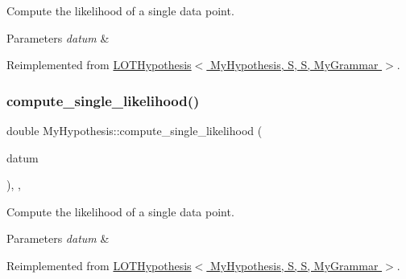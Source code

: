 Compute the likelihood of a single data point. 


\begin{DoxyParams}{Parameters}
{\em datum} & \\
\hline
\end{DoxyParams}


Reimplemented from \hyperlink{class_l_o_t_hypothesis_a0ff11e5e328fcfa819a8dd9b5d57bd65}{L\+O\+T\+Hypothesis$<$ My\+Hypothesis, S, S, My\+Grammar $>$}.

\mbox{\label{class_my_hypothesis_af23a45a03a28ea4f42438e70d47acacb}} 
\subsubsection{\texorpdfstring{compute\+\_\+single\+\_\+likelihood()}{compute\_single\_likelihood()}\hspace{0.1cm}{\footnotesize\ttfamily [2/5]}}
{\footnotesize\ttfamily double My\+Hypothesis\+::compute\+\_\+single\+\_\+likelihood (\begin{DoxyParamCaption}\item[{const \hyperlink{class_bayesable_a9f1a6c0cd7855550fa10b1a8f13a5867}{datum\+\_\+t} \&}]{datum }\end{DoxyParamCaption})\hspace{0.3cm}{\ttfamily [inline]}, {\ttfamily [override]}, {\ttfamily [virtual]}}



Compute the likelihood of a single data point. 


\begin{DoxyParams}{Parameters}
{\em datum} & \\
\hline
\end{DoxyParams}


Reimplemented from \hyperlink{class_l_o_t_hypothesis_a0ff11e5e328fcfa819a8dd9b5d57bd65}{L\+O\+T\+Hypothesis$<$ My\+Hypothesis, S, S, My\+Grammar $>$}.

\mbox{\label{class_my_hypothesis_af23a45a03a28ea4f42438e70d47acacb}} 
